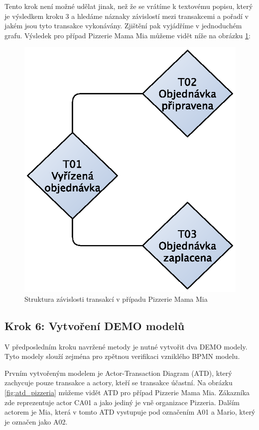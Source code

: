 Tento krok není možné udělat jinak, než že se vrátíme k textovému popisu, který je výsledkem kroku 3 a hledáme náznaky závislostí mezi transakcemi a pořadí v jakém jsou tyto transakce vykonávány. Zjištění pak vyjádříme v jednoduchém grafu. Výsledek pro případ Pizzerie Mama Mia můžeme vidět níže na obrázku \ref{fig:result_structure_chart}:

\begin{figure}[H]\centering
\includegraphics[scale=0.75]{obrazky/result-structure-chart-pizzeria}
\caption{Struktura závislosti transakcí v případu Pizzerie Mama Mia}
\label{fig:result_structure_chart}
\end{figure}

\subsection{Krok 6: Vytvoření DEMO modelů}
V předposledním kroku navržené metody je nutné vytvořit dva DEMO modely. Tyto modely slouží zejména pro zpětnou verifikaci vzniklého BPMN modelu.

Prvním vytvořeným modelem je Actor-Transaction Diagram (ATD), který zachycuje pouze transakce a actory, kteří se transakce účastní. Na obrázku \ref{fig:atd_pizzeria} můžeme vidět ATD pro případ Pizzerie Mama Mia. Zákazníka zde reprezentuje actor CA01 a jako jediný je vně organizace Pizzeria. Dalším actorem je Mia, která v tomto ATD vystupuje pod označením A01 a Mario, který je označen jako A02.

